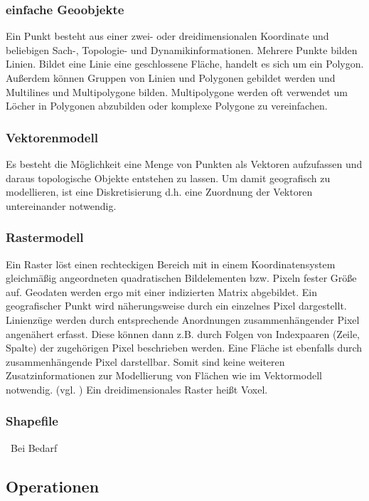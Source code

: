 \subsubsection{einfache Geoobjekte}
Ein Punkt besteht aus einer zwei- oder dreidimensionalen Koordinate und beliebigen Sach-, Topologie- und Dynamikinformationen.
Mehrere Punkte bilden Linien.
Bildet eine Linie eine geschlossene Fläche, handelt es sich um ein Polygon.
Außerdem können Gruppen von Linien und Polygonen gebildet werden und Multilines und Multipolygone bilden.
Multipolygone werden oft verwendet um Löcher in Polygonen abzubilden oder komplexe Polygone zu vereinfachen.

\subsubsection{Vektorenmodell}

Es besteht die Möglichkeit eine Menge von Punkten als Vektoren aufzufassen und daraus topologische Objekte entstehen zu lassen.
Um damit geografisch zu modellieren, ist eine Diskretisierung d.h. eine Zuordnung der Vektoren untereinander notwendig. 

\subsubsection{Rastermodell}
Ein Raster löst einen rechteckigen Bereich mit in einem Koordinatensystem gleichmäßig angeordneten quadratischen Bildelementen bzw. Pixeln fester Größe auf.
Geodaten werden ergo mit einer indizierten Matrix abgebildet.
Ein geografischer Punkt wird näherungsweise durch ein einzelnes Pixel dargestellt.
Linienzüge werden durch entsprechende Anordnungen zusammenhängender Pixel angenähert erfasst.
Diese können dann z.B. durch Folgen von Indexpaaren (Zeile, Spalte) der zugehörigen Pixel beschrieben werden.
Eine Fläche ist ebenfalls durch zusammenhängende Pixel darstellbar.
Somit sind keine weiteren Zusatzinformationen zur Modellierung von Flächen wie im Vektormodell notwendig. (vgl. \cite[S.136]{book:gi-theopluspraxis3})
Ein dreidimensionales Raster heißt Voxel.


\subsubsection{Shapefile}\
Bei Bedarf

\subsection{Operationen}

